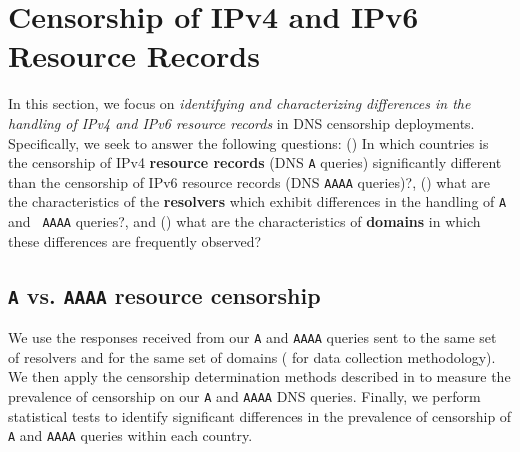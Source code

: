 \section{Censorship of IPv4 and IPv6 Resource Records} \label{sec:resources}

In this section, we focus on {\it identifying and characterizing differences in
the handling of IPv4 and IPv6 resource records} in DNS censorship deployments.
Specifically, we seek to answer the following questions: 
%
() In which countries is the censorship of IPv4
\textbf{resource records} (DNS {\tt A} queries) significantly different than the
censorship of IPv6 resource records (DNS {\tt AAAA} queries)?,
%
() what are the characteristics of the
\textbf{resolvers} which exhibit differences in the handling of {\tt A} and {\tt
AAAA} queries?, and 
%
() what are the characteristics of \textbf{domains}
in which these differences are frequently observed?
%

\subsection{{\tt A} vs. {\tt AAAA} resource censorship} \label{sec:resources:country}
%
We use the responses received from our {\tt A} and {\tt AAAA} queries sent to
the same set of resolvers and for the same set of domains (\cf
{} for data collection methodology). We then apply the
censorship determination methods described in 
to measure the prevalence of censorship on our {\tt A} and {\tt AAAA} DNS
queries. Finally, we perform statistical tests to identify significant
differences in the prevalence of censorship of {\tt A} and {\tt AAAA} queries
within each country.

